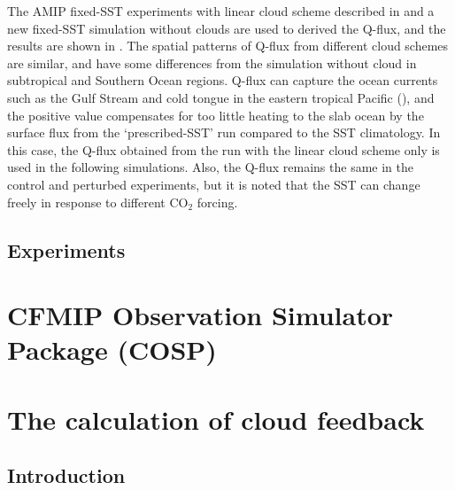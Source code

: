 The AMIP fixed-SST experiments with linear cloud scheme described in  and a new fixed-SST simulation without clouds are used to derived the Q-flux, and the results are shown in . The spatial patterns of Q-flux from different cloud schemes are similar, and have some differences from the simulation without cloud in subtropical and Southern Ocean regions. Q-flux can capture the ocean currents such as the Gulf Stream and cold tongue in the eastern tropical Pacific (), and the positive value compensates for too little heating to the slab ocean by the surface flux from the `prescribed-SST’ run compared to the SST climatology. In this case, the Q-flux obtained from the run with the linear cloud scheme only is used in the following simulations. Also, the Q-flux remains the same in the control and perturbed experiments, but it is noted that the SST can change freely in response to different CO$_2$ forcing. 

\subsection{Experiments}


\section{CFMIP Observation Simulator Package (COSP)}
\label{sec:cosp}

\section{The calculation of cloud feedback}
\label{sec:method_cloud_fbk}

\subsection{Introduction}

